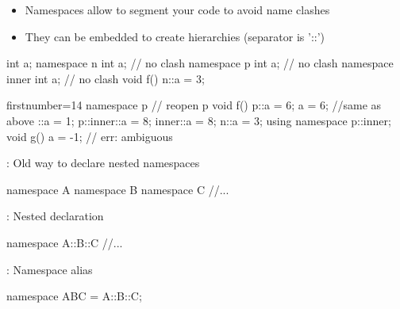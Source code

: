 \begin{frame}[fragile]
\begin{multicols}{2}

  \end{multicols}
\end{frame}

\begin{frame}[fragile]
  \begin{itemize}
  \item Namespaces allow to segment your code to avoid name clashes
  \item They can be embedded to create hierarchies (separator is '::')
  \end{itemize}
  \begin{multicols}{2}
    \begin{cppcode*}{}
      int a;
      namespace n {
        int a;   // no clash
      }
      namespace p {
        int a;   // no clash
        namespace inner {
          int a; // no clash
        }
      }
      void f() {
        n::a = 3;
      }
    \end{cppcode*}
    \columnbreak
    \begin{cppcode*}{firstnumber=14}
      namespace p { // reopen p
        void f() {
          p::a = 6;
          a = 6;  //same as above
          ::a = 1;
          p::inner::a = 8;
          inner::a = 8;
          n::a = 3;
        }
      }
      using namespace p::inner;
      void g() {
        a = -1; // err: ambiguous
      }
  \end{cppcode*}
  \end{multicols}
\end{frame}

\begin{frame}[fragile]
  \begin{alertblock}{: Old way to declare nested namespaces}
    \begin{cppcode*}{}
      namespace A {
        namespace B {
          namespace C {
            //...
          }
        }
      }
    \end{cppcode*}
  \end{alertblock}
  \begin{exampleblock}{: Nested declaration}
    \begin{cppcode*}{}
      namespace A::B::C {
        //...
      }
    \end{cppcode*}
  \end{exampleblock}
  \begin{exampleblock}{: Namespace alias}
    \begin{cppcode*}{}
      namespace ABC = A::B::C;
    \end{cppcode*}
  \end{exampleblock}
\end{frame}


